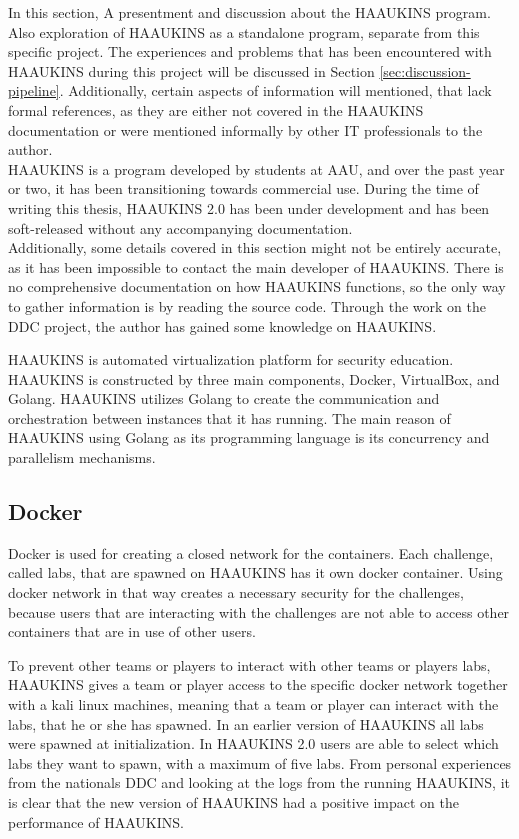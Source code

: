 In this section, A presentment and discussion about the \ac{HAAUKINS} program. 
Also exploration of \ac{HAAUKINS} as a standalone program, separate from this 
specific project. 
The experiences and problems that has been encountered with \ac{HAAUKINS} during 
this project will be discussed in Section \ref{sec:discussion-pipeline}. 
Additionally, certain aspects of information will mentioned, that lack formal references, 
as they are either not covered in the \ac{HAAUKINS} documentation or were mentioned 
informally by other IT professionals to the author.\\
\ac{HAAUKINS} is a program developed by students at \ac{AAU},
and over the past year or two, it has been transitioning towards commercial use. 
During the time of writing this thesis, \ac{HAAUKINS} 2.0 has been under development and 
has been soft-released without any accompanying documentation. \\
Additionally, some details covered in this section might not be entirely accurate, 
as it has been impossible to contact the main developer of \ac{HAAUKINS}. 
There is no comprehensive documentation on how \ac{HAAUKINS} functions, 
so the only way to gather information is by reading the source code.
Through the work on the \ac{DDC} project, the author has gained some 
knowledge on \ac{HAAUKINS}.

\ac{HAAUKINS} is automated virtualization platform for security education. 
\ac{HAAUKINS} is constructed by three main components, Docker, VirtualBox, and \ac{Golang}.
\ac{HAAUKINS} utilizes \ac{Golang} to create the communication and orchestration between instances that 
it has running. The main reason of \ac{HAAUKINS} using \ac{Golang} as its programming language is its concurrency and 
parallelism mechanisms.\cite{haaukins}

\subsection{Docker}
\label{sec:haaukins-docker}
Docker is used for creating a closed network for the containers. Each challenge, called labs, that are 
spawned on \ac{HAAUKINS} has it own docker container. Using docker network in that
way creates a necessary security for the challenges, because users that are 
interacting with the challenges are not able to access other containers that are in use of 
other users.

To prevent other teams or players to interact with other teams or players labs,
\ac{HAAUKINS}
gives a team or player access to the specific docker network together with a kali linux machines, 
meaning that a team or player can interact with the labs, that he or she has spawned. 
In an earlier version of \ac{HAAUKINS} all labs were spawned at initialization. In \ac{HAAUKINS} 2.0
users are able to select which labs they want to spawn,
with a maximum of five labs. 
From personal experiences from the nationals \ac{DDC} and 
looking at the logs from the running \ac{HAAUKINS}, it is clear that the new version of \ac{HAAUKINS}
had a positive impact on the performance of \ac{HAAUKINS}.

